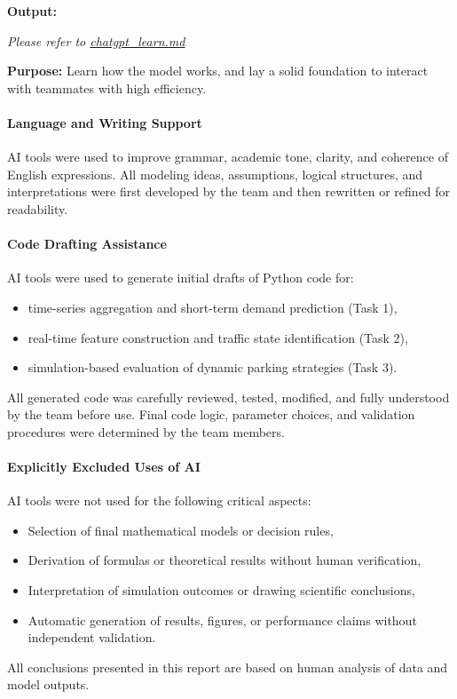 \textbf{Output:}

\textit{Please refer to \href{https://github.com/Jincan-LI-HUB/2026_MCM_Simulation_Problem_B/blob/master/AI_declaration_files/chatgpt_learn.md}{chatgpt\_learn.md}}

\textbf{Purpose:} Learn how the model works, and lay a solid foundation to interact with teammates with high efficiency. 




\paragraph{Language and Writing Support}
AI tools were used to improve grammar, academic tone, clarity, and coherence of English expressions.
All modeling ideas, assumptions, logical structures, and interpretations were first developed by the team and then rewritten or refined for readability.

\paragraph{Code Drafting Assistance}
AI tools were used to generate initial drafts of Python code for:
\begin{itemize}
  \item time-series aggregation and short-term demand prediction (Task 1),
  \item real-time feature construction and traffic state identification (Task 2),
  \item simulation-based evaluation of dynamic parking strategies (Task 3).
\end{itemize}
All generated code was carefully reviewed, tested, modified, and fully understood by the team before use.
Final code logic, parameter choices, and validation procedures were determined by the team members.

\paragraph{Explicitly Excluded Uses of AI}
AI tools were not used for the following critical aspects:
\begin{itemize}
  \item Selection of final mathematical models or decision rules,
  \item Derivation of formulas or theoretical results without human verification,
  \item Interpretation of simulation outcomes or drawing scientific conclusions,
  \item Automatic generation of results, figures, or performance claims without independent validation.
\end{itemize}
All conclusions presented in this report are based on human analysis of data and model outputs.

